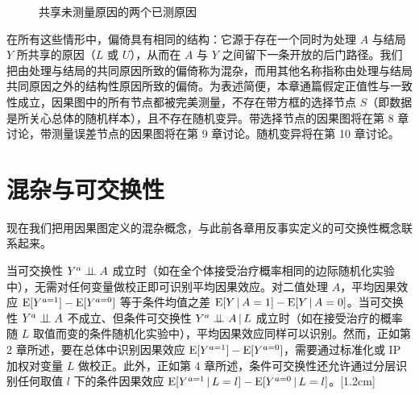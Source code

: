 
\begin{figure}[htbp]
\centering
{}
\caption{共享未测量原因的两个已测原因}
\label{fig:7.3}
\end{figure}

在所有这些情形中，偏倚具有相同的结构：它源于存在一个同时为处理 $A$ 与结局 $Y$ 所共享的原因（$L$ 或 $U$），从而在 $A$ 与 $Y$ 之间留下一条开放的后门路径。我们把由处理与结局的共同原因所致的偏倚称为混杂，而用其他名称指称由处理与结局共同原因之外的结构性原因所致的偏倚。为表述简便，本章通篇假定正值性与一致性成立，因果图中的所有节点都被完美测量，不存在带方框的选择节点 $S$（即数据是所关心总体的随机样本），且不存在随机变异。带选择节点的因果图将在第 8 章讨论，带测量误差节点的因果图将在第 9 章讨论。随机变异将在第 10 章讨论。

\section{混杂与可交换性}

现在我们把用因果图定义的混杂概念，与此前各章用反事实定义的可交换性概念联系起来。

当可交换性 $Y^{a}\perp\!\!\!\perp A$ 成立时（如在全个体接受治疗概率相同的边际随机化实验中），无需对任何变量做校正即可识别平均因果效应。对二值处理 $A$，平均因果效应 $\mathrm{E}[Y^{a=1}]-\mathrm{E}[Y^{a=0}]$ 等于条件均值之差 $\mathrm{E}[Y\,|\, A=1]-\mathrm{E}[Y\,|\, A=0]$。当可交换性 $Y^{a}\perp\!\!\!\perp A$ 不成立、但条件可交换性 $Y^{a}\perp\!\!\!\perp A\,|\, L$ 成立时（如在接受治疗的概率随 $L$ 取值而变的条件随机化实验中），平均因果效应同样可以识别。然而，正如第 2 章所述，要在总体中识别因果效应 $\mathrm{E}[Y^{a=1}]-\mathrm{E}[Y^{a=0}]$，需要通过标准化或 IP 加权对变量 $L$ 做校正。此外，正如第 4 章所述，条件可交换性还允许通过分层识别任何取值 $l$ 下的条件因果效应 $\mathrm{E}[Y^{a=1}\,|\, L=l]-\mathrm{E}[Y^{a=0}\,|\, L=l]$。\marginnote{\textcolor{black!85}{关于混杂与可交换性之间关系的详细讨论，见 Greenland and Robins (1986, 2009)。}}[1.2cm]

